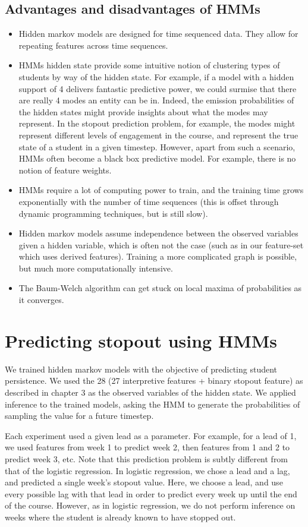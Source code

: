 \subsection{Advantages and disadvantages of HMMs} 
\begin{itemize}
\item Hidden markov models are designed for time sequenced data. They allow for repeating features across time sequences. 
\item HMMs hidden state provide some intuitive notion of clustering types of students by way of the hidden state. For example, if a model with a hidden support of 4 delivers fantastic predictive power, we could surmise that there are really 4 modes an entity can be in. Indeed, the emission probabilities of the hidden states might provide insights about what the modes may represent. In the stopout prediction problem, for example, the modes might represent different levels of engagement in the course, and represent the true state of a student in a given timestep. However, apart from such a scenario, HMMs often become a black box predictive model. For example, there is no notion of feature weights. 
\item HMMs require a lot of computing power to train, and the training time grows exponentially with the number of time sequences (this is offset through dynamic programming techniques, but is still slow). 
\item Hidden markov models assume independence between the observed variables given a hidden variable, which is often not the case (such as in our feature-set which uses derived features). Training a more complicated graph is possible, but much more computationally intensive.
\item The Baum-Welch algorithm can get stuck on local maxima of probabilities as it converges.
\end{itemize}

\section{Predicting stopout using HMMs}
We trained hidden markov models with the objective of predicting student persistence. We used the 28 (27 interpretive features + binary stopout feature) as described in chapter 3 as the observed variables of the hidden state. We applied inference to the trained models, asking the HMM to generate the probabilities of sampling the \sti value for a future timestep.

Each experiment used a given lead as a parameter. For example, for a lead of 1, we used features from week 1 to predict week 2, then features from 1 and 2 to predict week 3, etc. Note that this prediction problem is subtly different from that of the logistic regression. In logistic regression, we chose a lead and a lag, and predicted a single week's stopout value. Here, we choose a lead, and use every possible lag with that lead in order to predict every week up until the end of the course. However, as in logistic regression, we do not perform inference on weeks where the student is already known to have stopped out.

